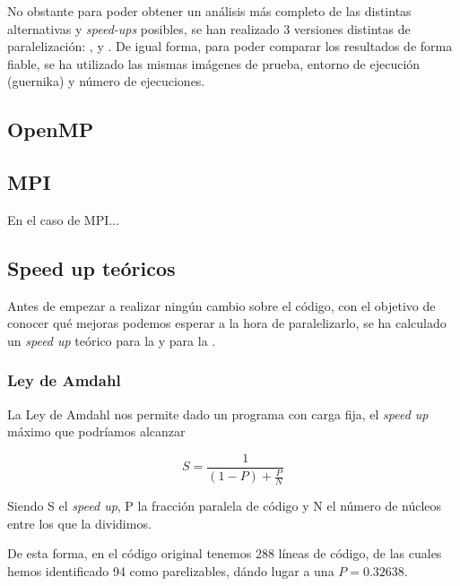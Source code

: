 \documentclass[12pt]{report} %
\begin{document}
No obstante para poder obtener un análisis más completo de las distintas alternativas y \textit{speed-ups}
posibles, se han realizado 3 versiones distintas de paralelización: , 
y . De igual forma, para poder comparar los resultados de forma fiable, se ha
utilizado las mismas imágenes de prueba, entorno de ejecución (guernika) y número de ejecuciones.


\subsection{OpenMP}


\subsection{MPI}

En el caso de MPI...


\subsection{Speed up teóricos}

Antes de empezar a realizar ningún cambio sobre el código, con el objetivo de conocer qué mejoras
podemos esperar a la hora de paralelizarlo, se ha calculado un \textit{speed up} teórico para
la  y para la .

\subsubsection{Ley de Amdahl}
\label{sec:Amdahl}

La Ley de Amdahl nos permite dado un programa con carga fija, el \textit{speed up} máximo que podríamos alcanzar

\[ S = \frac{1}{(1 - P) + \frac{P}{N}} \]

Siendo S el \textit{speed up}, P la fracción paralela de código y N el número de núcleos entre
los que la dividimos.

De esta forma, en el código original tenemos 288 líneas de código, de las cuales hemos identificado
94 como parelizables, dándo lugar a una $P = 0.32638$.
\end{document}
